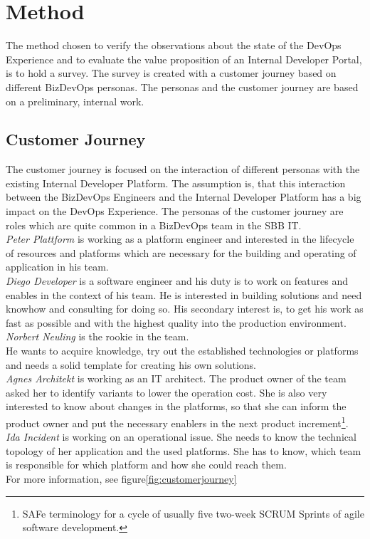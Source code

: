 \documentclass[a4paper,12pt]{article}
\begin{document}
    \section{Method}
    \label{sec:method}
    The method chosen to verify the observations about the state of the DevOps Experience and to evaluate the value proposition
    of an Internal Developer Portal, is to hold a survey.
    The survey is created with a customer journey based on different BizDevOps personas.
    The personas and the customer journey are based on a preliminary, internal work\parencite{sbbjobstobedone}.

    \subsection{Customer Journey}
    \label{subsec:cusjour}
    The customer journey is focused on the interaction of different personas with the existing Internal Developer Platform.
    The assumption is, that this interaction between the BizDevOps Engineers and the Internal Developer Platform has a big
    impact on the DevOps Experience.
    The personas of the customer journey are roles which are quite common in a BizDevOps team in the SBB IT.\\
    \textit{Peter Plattform} is working as a platform engineer and interested in the lifecycle of resources and platforms which
    are necessary for the building and operating of application in his team.\\
    \textit{Diego Developer} is a software engineer and his duty is to work on features and enables in the context of his team.
    He is interested in building solutions and need knowhow and consulting for doing so.
    His secondary interest is, to get his work as fast as possible and with the highest quality into the production environment.
    \textit{Norbert Neuling} is the rookie in the team.\\
    He wants to acquire knowledge, try out the established technologies or platforms and needs a solid template for creating
    his own solutions.\\
    \textit{Agnes Architekt} is working as an IT architect.
    The product owner of the team asked her to identify variants to lower the operation cost.
    She is also very interested
    to know about changes in the platforms, so that she can inform the product owner and put the necessary enablers in
    the next product increment\footnote{SAFe terminology for a cycle of usually five two-week SCRUM Sprints of agile software development.}.\\
    \textit{Ida Incident} is working on an operational issue.
    She needs to know the technical topology of her application and the used platforms.
    She has to know, which team is responsible for which platform and how she could reach them.\\
    For more information, see figure\ref{fig:customerjourney}
\end{document}
